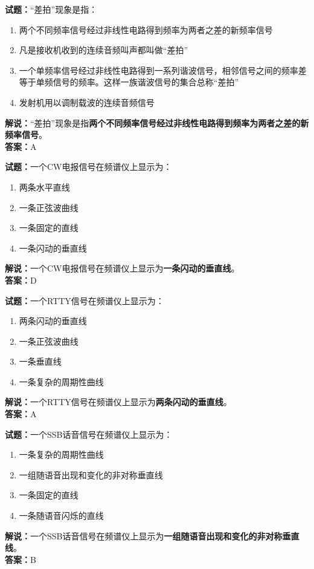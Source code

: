 \documentclass{ctexbook}
\begin{document}
\bigskip


\noindent\textbf{试题：}“差拍”现象是指：
\begin{enumerate}[leftmargin=3em]
\item 两个不同频率信号经过非线性电路得到频率为两者之差的新频率信号
\item 凡是接收机收到的连续音频叫声都叫做“差拍”
\item 一个单频率信号经过非线性电路得到一系列谐波信号，相邻信号之间的频率差等于单频信号的频率。这样一族谐波信号的集合总称“差拍”
\item 发射机用以调制载波的连续音频信号
\end{enumerate}
\noindent\textbf{解说：}“差拍”现象是指\textbf{两个不同频率信号经过非线性电路得到频率为两者之差的新频率信号}。\\\noindent\textbf{答案：}A





\bigskip


\noindent\textbf{试题：}一个CW电报信号在频谱仪上显示为：
\begin{enumerate}[leftmargin=3em]
\item 两条水平直线
\item 一条正弦波曲线
\item 一条固定的直线
\item 一条闪动的垂直线
\end{enumerate}
\noindent\textbf{解说：}一个CW电报信号在频谱仪上显示为\textbf{一条闪动的垂直线}。\\\noindent\textbf{答案：}D




\bigskip


\noindent\textbf{试题：}一个RTTY信号在频谱仪上显示为：
\begin{enumerate}[leftmargin=3em]
\item 两条闪动的垂直线
\item 一条正弦波曲线
\item 一条垂直线
\item 一条复杂的周期性曲线
\end{enumerate}
\noindent\textbf{解说：}一个RTTY信号在频谱仪上显示为\textbf{两条闪动的垂直线}。\\\noindent\textbf{答案：}A



\bigskip


\noindent\textbf{试题：}一个SSB话音信号在频谱仪上显示为：
\begin{enumerate}[leftmargin=3em]
\item 一条复杂的周期性曲线
\item 一组随语音出现和变化的非对称垂直线
\item 一条固定的直线
\item 一条随语音闪烁的直线
\end{enumerate}
\noindent\textbf{解说：}一个SSB话音信号在频谱仪上显示为\textbf{一组随语音出现和变化的非对称垂直线}。\\\noindent\textbf{答案：}B
\end{document}
